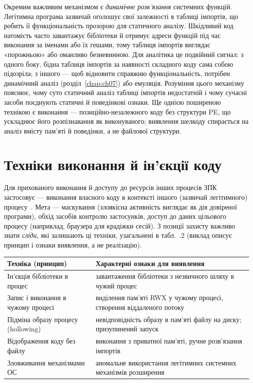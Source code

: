 Окремим важливим механізмом є \emph{динамічне розв'язання} системних функцій. Легітимна програма зазвичай оголошує свої залежності в таблиці імпортів, що робить її функціональність прозорою для статичного аналізу. Шкідливий код натомість часто завантажує бібліотеки й отримує адреси функцій під час виконання за іменами або їх гешами, тому таблиця імпортів виглядає «порожньою» або оманливо безневинною. Для аналітика це подвійний сигнал: з одного боку, бідна таблиця імпортів за наявності складного коду сама собою підозріла; з іншого --- щоб відновити справжню функціональність, потрібен динамічний аналіз (розділ~\ref{chap:ch07}) або емуляція. Розуміння цього механізму пояснює, чому суто статичний аналіз таблиці імпортів недостатній і чому сучасні засоби поєднують статичні й поведінкові ознаки. Ще однією поширеною технікою є виконання  --- позиційно-незалежного коду без структури PE, що ускладнює його розпізнавання як виконуваного; виявлення шелкоду спирається на аналіз вмісту пам'яті й поведінки, а не файлової структури.

\section{Техніки виконання й ін'єкції коду}\label{sec:ch05-injection}

Для прихованого виконання й доступу до ресурсів інших процесів ЗПК застосовує  --- виконання власного коду в контексті іншого (зазвичай легітимного) процесу~\cite{ch05:barnea,ch05:klein,ch05:attck-t1055}. Мета --- маскування (злоякісна активність виглядає як дія довіреної програми), обхід засобів контролю застосунків, доступ до даних цільового процесу (наприклад, браузера для крадіжки сесій). З позиції захисту важливо знати \emph{сліди}, які залишають ці техніки, узагальнені в табл.~\thechapter.2 (виклад описує принцип і ознаки виявлення, а не реалізацію).


\begin{center}\footnotesize
\begin{tabularx}{\linewidth}{L{28mm} Y}
\toprule
Техніка (принцип) & Характерні ознаки для виявлення \\
\midrule
Ін'єкція бібліотеки в процес & завантаження бібліотеки з незвичного шляху в чужий процес \\
Запис і виконання в чужому процесі & виділення пам'яті RWX у чужому процесі, створення віддаленого потоку \\
Підміна образу процесу (hollowing) & невідповідність образу в пам'яті файлу на диску; призупинений запуск \\
Відображення коду без файлу & виконання з приватної пам'яті, ручне розв'язання імпортів \\
Зловживання механізмами ОС & аномальне використання легітимних системних механізмів розширення \\
\bottomrule
\end{tabularx}
\end{center}

